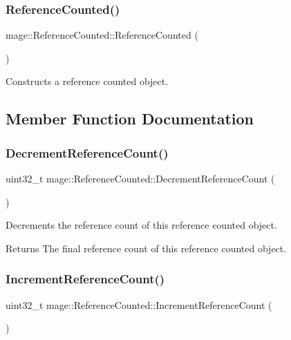 \subsubsection{\texorpdfstring{Reference\+Counted()}{ReferenceCounted()}}
{\footnotesize\ttfamily mage\+::\+Reference\+Counted\+::\+Reference\+Counted (\begin{DoxyParamCaption}{ }\end{DoxyParamCaption})\hspace{0.3cm}{\ttfamily [protected]}}

Constructs a reference counted object. 

\subsection{Member Function Documentation}
\hypertarget{classmage_1_1_reference_counted_a11304e23189f970ad2f10268b318549f}{}\label{classmage_1_1_reference_counted_a11304e23189f970ad2f10268b318549f} 
\subsubsection{\texorpdfstring{Decrement\+Reference\+Count()}{DecrementReferenceCount()}}
{\footnotesize\ttfamily uint32\+\_\+t mage\+::\+Reference\+Counted\+::\+Decrement\+Reference\+Count (\begin{DoxyParamCaption}{ }\end{DoxyParamCaption})}

Decrements the reference count of this reference counted object.

\begin{DoxyReturn}{Returns}
The final reference count of this reference counted object. 
\end{DoxyReturn}
\hypertarget{classmage_1_1_reference_counted_a3d625b492edec2844b4733b82ec5fd3f}{}\label{classmage_1_1_reference_counted_a3d625b492edec2844b4733b82ec5fd3f} 
\subsubsection{\texorpdfstring{Increment\+Reference\+Count()}{IncrementReferenceCount()}}
{\footnotesize\ttfamily uint32\+\_\+t mage\+::\+Reference\+Counted\+::\+Increment\+Reference\+Count (\begin{DoxyParamCaption}{ }\end{DoxyParamCaption})}

